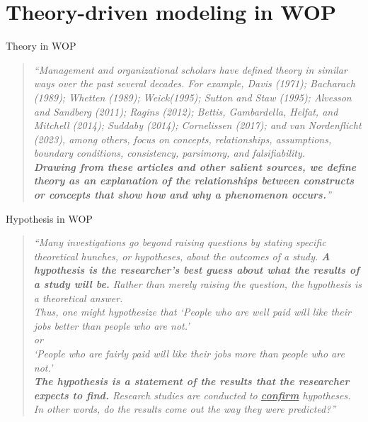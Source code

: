 \documentclass{beamer}
\begin{document}

\section{Theory-driven modeling in WOP}

\begin{frame}{Theory in WOP}
    \begin{quote}
        \small
        \textit{``Management and organizational scholars have defined theory in similar ways over the past several decades. For example, Davis (1971); Bacharach (1989); Whetten (1989); Weick(1995); Sutton and Staw (1995); Alvesson and Sandberg (2011); Ragins (2012); Bettis, Gambardella, Helfat, and Mitchell (2014); Suddaby (2014); Cornelissen (2017); and van Nordenflicht (2023), among others, focus on concepts, relationships, assumptions, boundary conditions, consistency, parsimony, and falsifiability.\\ \textbf{Drawing from these articles and other salient sources, we define theory as an explanation of the relationships between constructs or concepts that show how and why a phenomenon occurs.}''}
        \begin{flushright}
            \scriptsize
            \parencite[p. 1183-1184]{thatcher2024_JOM}
        \end{flushright}
    \end{quote}
\end{frame}


\begin{frame}{Hypothesis in WOP}
    \begin{quote}
        \small
        \textit{``Many investigations go beyond raising questions by stating specific theoretical hunches, or hypotheses, about the outcomes of a study. \textbf{A hypothesis is the researcher’s best guess about what the results of a study will be.} Rather than merely raising the question, the hypothesis is a theoretical answer. \\ Thus, one might hypothesize that `People who are well paid will like their jobs better than people who are not.'\\ or\\ `People who are fairly paid will like their jobs more than people who are not.'\\ \textbf{The hypothesis is a statement of the results that the researcher expects to find.} Research studies are conducted to \textbf{\underline{confirm}} hypotheses. In other words, do the results come out the way they were predicted?''}
        \begin{flushright}
            \scriptsize
             \parencite[p. 25]{spector2017}
        \end{flushright}
    \end{quote}
\end{frame}
\end{document}
